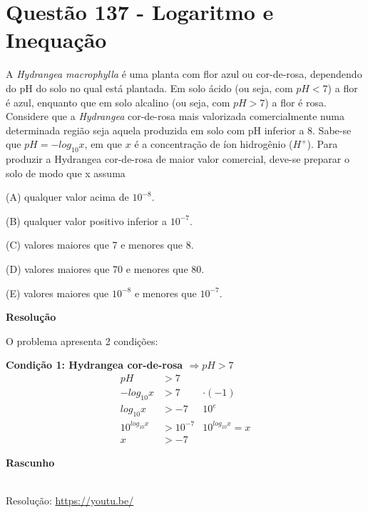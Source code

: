 \section{Questão 137 - Logaritmo e Inequação}

A \textit{Hydrangea macrophylla} é uma planta com flor azul ou cor-de-rosa, dependendo do pH do solo no qual está plantada. Em solo ácido (ou seja, com $ pH < 7 $) a flor é azul, enquanto que em solo alcalino (ou seja, com $ pH > 7 $) a flor é rosa. Considere que a \textit{Hydrangea} cor-de-rosa mais valorizada comercialmente numa determinada região seja aquela produzida em solo com pH inferior a 8. 
Sabe-se que $ pH = - log_{10} x $, em que $ x $ é a concentração de íon hidrogênio ($ H^+ $).
Para produzir a Hydrangea cor-de-rosa de maior valor comercial, deve-se preparar o solo de modo que x assuma

\noindent (A) qualquer valor acima de $ 10^{-8} $.

\noindent (B) qualquer valor positivo inferior a $ 10^{-7} $.

\noindent (C) valores maiores que 7 e menores que 8.

\noindent (D) valores maiores que 70 e menores que 80.

\noindent (E) valores maiores que $ 10^{-8} $ e menores que $ 10^{-7} $.


\textbf{Resolução}

O problema apresenta 2 condições:

\noindent \textbf{Condição 1: Hydrangea cor-de-rosa $ \Rightarrow pH > 7 $ }
\begin{align*}
            pH &> 7        &  \\
    -log_{10}x &> 7        & \cdot (-1) \\
     log_{10}x &> -7       & 10^e  \\
10^{log_{10}x} &> 10^{-7}  & 10^{log_{10}x} = x\\
            x  &> -7       & 
\end{align*}

\textbf{Rascunho}

\quad


\begin{center}
    \href{https://youtu.be/}{
    }\\
    Resolução: \url{https://youtu.be/}
\end{center}
